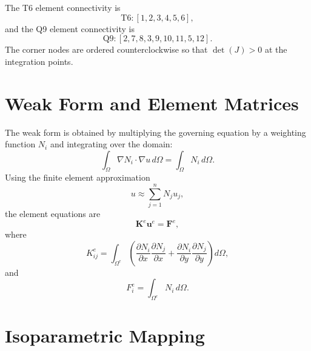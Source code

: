 \documentclass[12pt,a4paper]{article}
\begin{document}
The T6 element connectivity is
\begin{equation}
    \text{T6}: [1,2,3,4,5,6],
\end{equation}
and the Q9 element connectivity is
\begin{equation}
    \text{Q9}: [2,7,8,3,9,10,11,5,12].
\end{equation}
The corner nodes are ordered counterclockwise so that $\det(J)>0$ at the integration points.

\section{Weak Form and Element Matrices}

The weak form is obtained by multiplying the governing equation by a weighting function $N_i$ and integrating over the domain:
\begin{equation}
    \int_\Omega \nabla N_i \cdot \nabla u\,d\Omega = \int_\Omega N_i\,d\Omega.
\end{equation}
Using the finite element approximation
\begin{equation}
    u \approx \sum_{j=1}^{n} N_j u_j,
\end{equation}
the element equations are
\begin{equation}
    \bm{K}^e \bm{u}^e = \bm{F}^e,
\end{equation}
where
\begin{equation}
    K^e_{ij}=\int_{\Omega^e}\left(\frac{\partial N_i}{\partial x}\frac{\partial N_j}{\partial x}+\frac{\partial N_i}{\partial y}\frac{\partial N_j}{\partial y}\right)d\Omega,
\end{equation}
and
\begin{equation}
    F^e_i=\int_{\Omega^e}N_i\,d\Omega.
\end{equation}

\section{Isoparametric Mapping}
\end{document}
